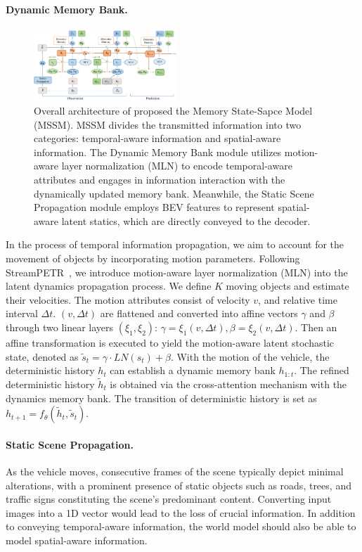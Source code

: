 \paragraph{Dynamic Memory Bank.}
\begin{figure}[t]
	\centering
	\includegraphics[width=0.48\textwidth]{figures/mssm}
	\caption{Overall architecture of proposed the Memory State-Sapce Model (MSSM). MSSM divides the transmitted information into two categories: temporal-aware information and spatial-aware information. The Dynamic Memory Bank module utilizes motion-aware layer normalization (MLN) to encode temporal-aware attributes and engages in information interaction with the dynamically updated memory bank. Meanwhile, the Static Scene Propagation module employs BEV features to represent spatial-aware latent statics, which are directly conveyed to the decoder.
	}
	\label{fig:mssm}
\end{figure}
In the process of temporal information propagation, we aim to account for the movement of objects by incorporating motion parameters.   Following StreamPETR~\cite{streampetr}, we introduce motion-aware layer normalization (MLN) into the latent dynamics propagation process. We define $K$ moving objects and estimate their velocities. The motion attributes consist of velocity $v$, and relative time interval $\Delta t$. $(v, \Delta t)$ are flattened and converted into affine vectors $\gamma $ and $\beta$ through two linear layers $(\xi_1, \xi_2)$: $\gamma = \xi_1(v, \Delta t),
\beta = \xi_2(v, \Delta t).$ 
Then an affine transformation is executed to yield the motion-aware latent stochastic state, denoted as $\tilde{  s}_{t} = \gamma \cdot LN(  s_{t}) + \beta.$
With the motion of the vehicle, the deterministic history $  h_t$ can establish a dynamic memory bank $  h_{1:t}$. The refined deterministic history $\tilde{  h}_t$ is obtained via the cross-attention mechanism with the dynamics memory bank.
The transition of deterministic history is set as $  h_{t+1}= f_\theta(\tilde{  h}_t, \tilde{  s}_{t}).$
\paragraph{Static Scene Propagation.} 
As the vehicle moves, consecutive frames of the scene typically depict minimal alterations, with a prominent presence of static objects such as roads, trees, and traffic signs constituting the scene's predominant content. Converting input images into a 1D vector would lead to the loss of crucial information. In addition to conveying temporal-aware information, the world model should also be able to model spatial-aware information.

